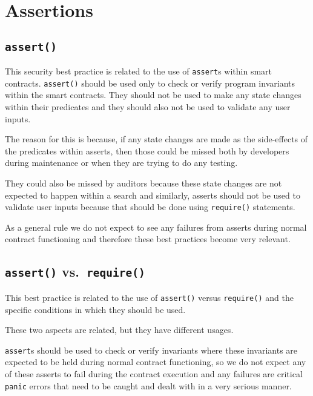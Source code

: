 \section{Assertions}\label{assertions}

\subsection{\texorpdfstring{\texttt{assert()}}{assert()}}\label{assert}

This security best practice is related to the use of \texttt{assert}s
within smart contracts. \texttt{assert()} should be used only to check
or verify program invariants within the smart contracts. They should not
be used to make any state changes within their predicates and they
should also not be used to validate any user inputs.

The reason for this is because, if any state changes are made as the
side-effects of the predicates within asserts, then those could be
missed both by developers during maintenance or when they are trying to
do any testing.

They could also be missed by auditors because these state changes are
not expected to happen within a search and similarly, asserts should not
be used to validate user inputs because that should be done using
\texttt{require()} statements.

As a general rule we do not expect to see any failures from asserts
during normal contract functioning and therefore these best practices
become very relevant.

\subsection{\texorpdfstring{\texttt{assert()}
vs.~\texttt{require()}}{assert() vs.~require()}}\label{assert-vs.-require}

This best practice is related to the use of \texttt{assert()} versus
\texttt{require()} and the specific conditions in which they should be
used.

These two aspects are related, but they have different usages.

\texttt{assert}s should be used to check or verify invariants where
these invariants are expected to be held during normal contract
functioning, so we do not expect any of these asserts to fail during the
contract execution and any failures are critical \texttt{panic} errors
that need to be caught and dealt with in a very serious manner.

